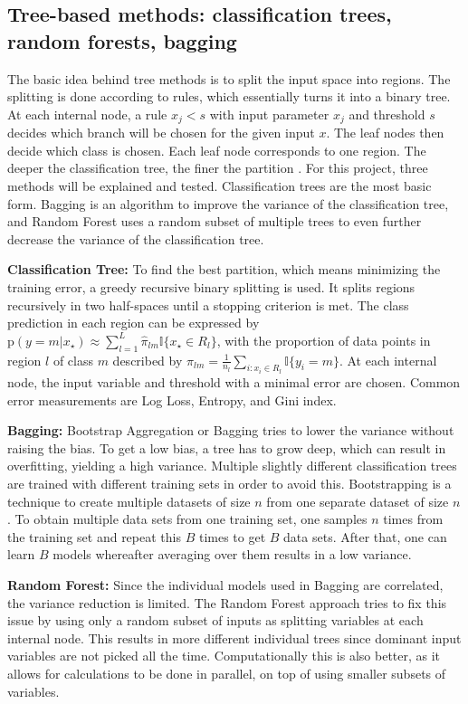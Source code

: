\documentclass{article}
\begin{document}
\subsection{Tree-based methods: classification trees, random forests, bagging}

The basic idea behind tree methods is to split the input space into regions. The splitting is done according to rules, which essentially turns it into a binary tree. At each internal node, a rule $x_j < s$ with input parameter $x_j$ and threshold $s$ decides which branch will be chosen for the given input $x$. The leaf nodes then decide which class is chosen. Each leaf node corresponds to one region. The deeper the classification tree, the finer the partition \cite{smlbook}. For this project, three methods will be explained and tested. Classification trees are the most basic form. Bagging is an algorithm to improve the variance of the classification tree, and Random Forest uses a random subset of multiple trees to even further decrease the variance of the classification tree.

\textbf{Classification Tree:}
To find the best partition, which means minimizing the training error, a greedy recursive binary splitting is used. It splits regions recursively in two half-spaces until a stopping criterion is met. The class prediction in each region can be expressed by $\text{p}(y=m|x_\star)\approx \sum_{l=1}^{L}\hat{\pi}_{lm}\mathbb{I}\{x_\star\in R_l\}$, with the proportion of data points in region $l$ of class $m$ described by $\hat{\pi}_{lm}=\frac{1}{n_l}\sum_{i:x_i\in R_l}\mathbb{I}\{y_i=m\}$. At each internal node, the input variable and threshold with a minimal error are chosen. Common error measurements are Log Loss, Entropy, and Gini index\cite{smlbook}.

\textbf{Bagging:}
Bootstrap Aggregation or Bagging tries to lower the variance without raising the bias. To get a low bias, a tree has to grow deep, which can result in overfitting, yielding a high variance. Multiple slightly different classification trees are trained with different training sets in order to avoid this. Bootstrapping is a technique to create multiple datasets of size $n$ from one separate dataset of size $n$. To obtain multiple data sets from one training set, one samples $n$ times from the training set and repeat this $B$ times to get $B$ data sets. After that, one can learn $B$ models whereafter averaging over them results in a low variance.

\textbf{Random Forest:}
Since the individual models used in Bagging are correlated, the variance reduction is limited. The Random Forest approach tries to fix this issue by using only a random subset of inputs as splitting variables at each internal node. This results in more different individual trees since dominant input variables are not picked all the time. Computationally this is also better, as it allows for calculations to be done in parallel, on top of using smaller subsets of variables. %
\end{document}
